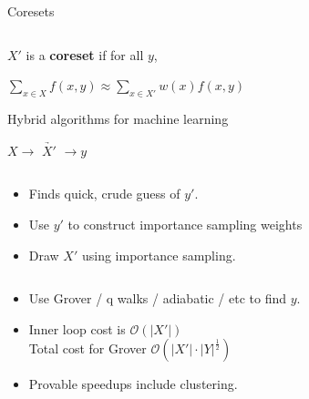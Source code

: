 \documentclass[
  ignorenonframetext,
]{beamer}
\begin{document}
\begin{frame}{Coresets}
\begin{columns}[T]
\end{columns}

\pause

\begin{block}{}
\protect\hypertarget{section-5}{}
\(X'\) is a \textbf{coreset} if for all \(y\),

\(\sum_{x \in X} f(x, y) \approx \sum_{x \in X'} w(x) f(x, y)\)
\end{block}
\end{frame}

\begin{frame}{Hybrid algorithms for machine learning}
\protect\hypertarget{hybrid-algorithms-for-machine-learning}{}
\begin{center}
$X \rightarrow$  $\underrightarrow{X'}$  $\rightarrow y$
\end{center}

\begin{columns}
\begin{small}
\begin{column}{.5\textwidth}

\begin{itemize}
\item Finds quick, crude guess of $y'$.
\item Use $y'$ to construct importance sampling weights
\item Draw $X'$ using importance sampling.
\end{itemize}

\end{column}
\begin{column}{.5\textwidth}

\begin{itemize}
\item Use Grover / q walks / adiabatic / etc to find $y$.
\item Inner loop cost is $\mathcal{O}(\left|X'\right|)$ \\ Total cost for Grover $\mathcal{O}(\left|X'\right| \cdot \left|Y\right|^{\frac12})$
\item Provable speedups include clustering.
\end{itemize}

\end{column}
\end{small}
\end{columns}
\end{frame}
\end{document}
